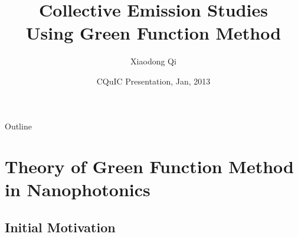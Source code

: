 \documentclass{beamer}
\title[Collective Emission Studies Using Green Function Method] %
{Collective Emission Studies\\ Using Green Function Method}
\author[Xiaodong Qi] %
{Xiaodong Qi} %
\institute[Universities of New Mexico] %
{
  Department of Physics and Astronomy, Universities of New Mexico
  }
\date[Jan, 2013] %
{CQuIC Presentation, Jan, 2013}
\begin{document}
\begin{frame}
  \titlepage
\end{frame}

\begin{frame}{Outline}
  \tableofcontents
\end{frame}





\section{Theory of Green Function Method in Nanophotonics}

\subsection{Initial Motivation}
\end{document}

